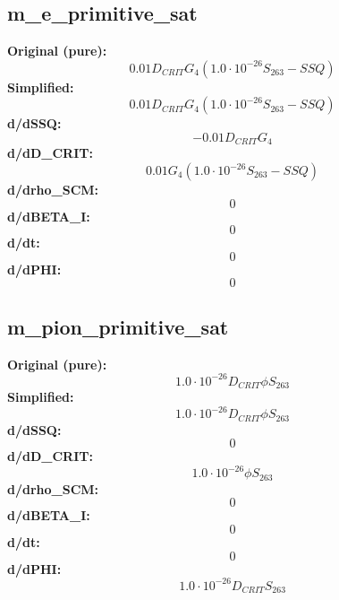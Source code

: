 \subsection{m_e_primitive_sat}
\textbf{Original (pure):}
\begin{equation}
0.01 D_{CRIT} G_{4} \left(1.0 \cdot 10^{-26} S_{26 3} - SSQ\right)
\end{equation}
\textbf{Simplified:}
\begin{equation}
0.01 D_{CRIT} G_{4} \left(1.0 \cdot 10^{-26} S_{26 3} - SSQ\right)
\end{equation}
\textbf{d/dSSQ:}
\begin{equation}
- 0.01 D_{CRIT} G_{4}
\end{equation}
\textbf{d/dD_CRIT:}
\begin{equation}
0.01 G_{4} \left(1.0 \cdot 10^{-26} S_{26 3} - SSQ\right)
\end{equation}
\textbf{d/drho_SCM:}
\begin{equation}
0
\end{equation}
\textbf{d/dBETA_I:}
\begin{equation}
0
\end{equation}
\textbf{d/dt:}
\begin{equation}
0
\end{equation}
\textbf{d/dPHI:}
\begin{equation}
0
\end{equation}

\subsection{m_pion_primitive_sat}
\textbf{Original (pure):}
\begin{equation}
1.0 \cdot 10^{-26} D_{CRIT} \phi S_{26 3}
\end{equation}
\textbf{Simplified:}
\begin{equation}
1.0 \cdot 10^{-26} D_{CRIT} \phi S_{26 3}
\end{equation}
\textbf{d/dSSQ:}
\begin{equation}
0
\end{equation}
\textbf{d/dD_CRIT:}
\begin{equation}
1.0 \cdot 10^{-26} \phi S_{26 3}
\end{equation}
\textbf{d/drho_SCM:}
\begin{equation}
0
\end{equation}
\textbf{d/dBETA_I:}
\begin{equation}
0
\end{equation}
\textbf{d/dt:}
\begin{equation}
0
\end{equation}
\textbf{d/dPHI:}
\begin{equation}
1.0 \cdot 10^{-26} D_{CRIT} S_{26 3}
\end{equation}

